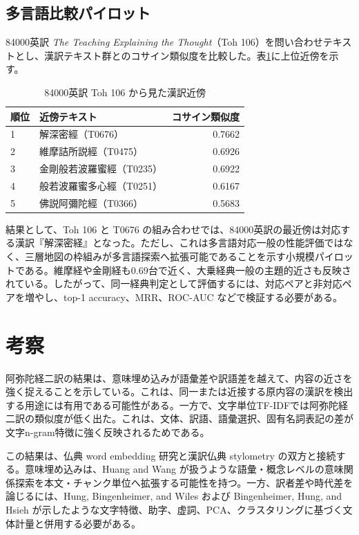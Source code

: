 \documentclass[uplatex,dvipdfmx,11pt,a4paper]{jsarticle}
\begin{document}
\subsection{多言語比較パイロット}

84000英訳 \textit{The Teaching Explaining the Thought}（Toh 106）を問い合わせテキストとし、漢訳テキスト群とのコサイン類似度を比較した。表\ref{tab:multilingual-pilot}に上位近傍を示す。

\begin{table}[H]
\centering
\caption{84000英訳 Toh 106 から見た漢訳近傍}
\label{tab:multilingual-pilot}
\begin{tabular}{llr}
\toprule
順位 & 近傍テキスト & コサイン類似度 \\
\midrule
1 & 解深密經（T0676） & 0.7662 \\
2 & 維摩詰所説經（T0475） & 0.6926 \\
3 & 金剛般若波羅蜜經（T0235） & 0.6922 \\
4 & 般若波羅蜜多心經（T0251） & 0.6167 \\
5 & 佛説阿彌陀經（T0366） & 0.5683 \\
\bottomrule
\end{tabular}
\end{table}

結果として、Toh 106 と T0676 の組み合わせでは、84000英訳の最近傍は対応する漢訳『解深密経』となった。ただし、これは多言語対応一般の性能評価ではなく、三層地図の枠組みが多言語探索へ拡張可能であることを示す小規模パイロットである。維摩経や金剛経も0.69台で近く、大乗経典一般の主題的近さも反映されている。したがって、同一経典判定として評価するには、対応ペアと非対応ペアを増やし、top-1 accuracy、MRR、ROC-AUC などで検証する必要がある。

\section{考察}

阿弥陀経二訳の結果は、意味埋め込みが語彙差や訳語差を越えて、内容の近さを強く捉えることを示している。これは、同一または近接する原内容の漢訳を検出する用途には有用である可能性がある。一方で、文字単位TF-IDFでは阿弥陀経二訳の類似度が低く出た。これは、文体、訳語、語彙選択、固有名詞表記の差が文字n-gram特徴に強く反映されるためである。

この結果は、仏典 word embedding 研究と漢訳仏典 stylometry の双方と接続する。意味埋め込みは、Huang and Wang が扱うような語彙・概念レベルの意味関係探索\cite{huang2023}を本文・チャンク単位へ拡張する可能性を持つ。一方、訳者差や時代差を論じるには、Hung, Bingenheimer, and Wiles および Bingenheimer, Hung, and Hsieh が示したような文字特徴、助字、虚詞、PCA、クラスタリングに基づく文体計量\cite{hung2010,bingenheimer2017}と併用する必要がある。
\end{document}
